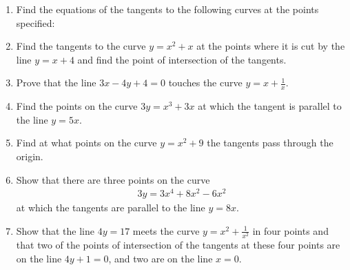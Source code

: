 \renewcommand{\theequation}{\theenumi}
\begin{enumerate}[label=\arabic*.,ref=\thesubsection.\theenumi]
\item Find the equations of the tangents to the following curves at the points specified:
\begin{multicols}{2}
\end{multicols}
\item Find the tangents to the curve $y=x^2+x$ at the points where it is cut by
the line $y=x+4$ and find the point of intersection of the tangents.
\item Prove that the line $3x-4y+4=0$ touches the curve $y=x+\frac{1}{x}$.
\item Find the points on the curve $3y=x^3+3x$ at which the tangent is
parallel to the line $y=5x$.
\item Find at what points on the curve $y=x^2+9$ the tangents pass through the origin.
\item Show that there are three points on the curve
\begin{align*}
3y=3x^4+8x^2-6x^2
\end{align*}
at which the tangents are parallel to the line $y=8x$.
\item Show that the  line $4y=17$ meets the curve $y = x^2+\frac{1}{x^2}$ in four points and that two of the points of intersection of the tangents at these
four points are on the line  $4y+1=0$, and two are on the line $x=0$.
\end{enumerate}
